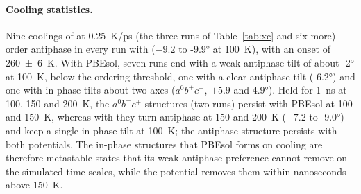 {\paragraph{Cooling statistics.} Nine coolings of \MASnI{} at \SI{0.25}{K/ps} (the three runs of Table~\ref{tab:xc} and six
more) order antiphase in every run with \rSCAN{} ($-9.2$ to \ang{-9.9} at \SI{100}{K}), with an onset of
\SI{260 \pm 6}{K}. With PBEsol, seven runs end with a weak antiphase tilt of about \ang{-2} at \SI{100}{K}, below the
ordering threshold, one with a clear antiphase tilt (\ang{-6.2}) and one with in-phase tilts about two axes
($a^0b^+c^+$, $+5.9$ and \ang{+4.9}). Held for \SI{1}{ns} at 100, 150 and \SI{200}{K}, the $a^0b^+c^+$ structures (two
runs) persist with PBEsol at 100 and \SI{150}{K}, whereas with \rSCAN{} they turn antiphase at 150 and \SI{200}{K}
($-7.2$ to \ang{-9.0}) and keep a single in-phase tilt at \SI{100}{K}; the antiphase structure persists with both
potentials. The in-phase structures that PBEsol forms on cooling are therefore metastable states that its weak
antiphase preference cannot remove on the simulated time scales, while the \rSCAN{} potential removes them within
nanoseconds above \SI{150}{K}.
}



